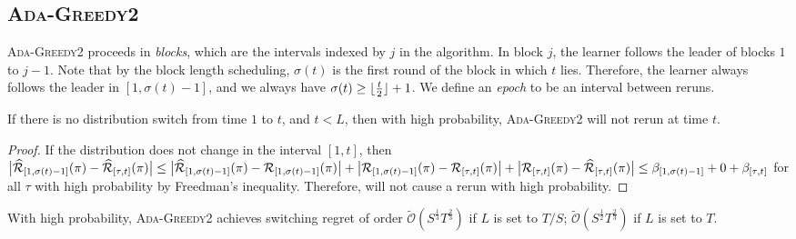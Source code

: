 \iffalse
\subsection{\textsc{Ada-Greedy2}}
\textsc{Ada-Greedy2} proceeds in \textit{blocks}, which are the intervals indexed by $j$ in the algorithm. In block $j$, the learner follows the leader of blocks $1$ to $j-1$. Note that by the block length scheduling, $\sigma(t)$ is the first round of the block in which $t$ lies. Therefore, the learner always follows the leader in $[1,\sigma(t)-1]$, and we always have $\sigma(t)\geq \lfloor\frac{t}{2}\rfloor+1$. We define an \textit{epoch} to be an interval between reruns. 
\begin{lemma}
\label{lemma:adagreedy2:no rerun}
If there is no distribution switch from time $1$ to $t$, and $t<L$, then with high probability, \textsc{Ada-Greedy2} will not rerun at time $t$. 
\end{lemma}
\begin{proof}
If the distribution does not change in the interval $[1,t]$, then $\big\lvert\widehat{\cal{R}}_{[1,\sigma(t)-1]}(\pi)-\widehat{\cal{R}}_{[\tau,t]}(\pi)\big\rvert\leq \big\lvert\widehat{\cal{R}}_{[1,\sigma(t)-1]}(\pi)-{\mathcal{R}}_{[1,\sigma(t)-1]}(\pi)\big\rvert+\big\lvert{\mathcal{R}}_{[1,\sigma(t)-1]}(\pi)-{\mathcal{R}}_{[\tau,t]}(\pi)\big\rvert+\big\lvert{\mathcal{R}}_{[\tau,t]}(\pi)-\widehat{\cal{R}}_{[\tau,t]}(\pi)\big\rvert\leq \beta_{[1,\sigma(t)-1]}+0+\beta_{[\tau,t]}$ for all $\tau$ with high probability by Freedman's inequality. Therefore, \test will not cause a rerun with high probability. 
\end{proof}
\begin{theorem}
With high probability, \textsc{Ada-Greedy2} achieves switching regret of order $\tilde{\mathcal{O}}( S^{\frac{1}{3}}T^{\frac{2}{3}} )$ if $L$ is set to $T/S$; $\tilde{\mathcal{O}}( S^{\frac{1}{2}}T^{\frac{2}{3}} )$ if $L$ is set to $T$. 
\end{theorem}
